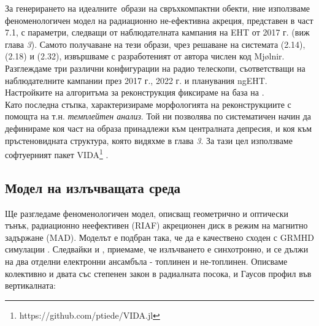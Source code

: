 За генерирането на идеалните$\,$ образи на свръхкомпактни обекти, ние използваме феноменологичен модел на радиационно не-ефективна акреция, представен в част 7.1, с параметри, следващи от наблюдателната кампания на EHT от 2017 г. (виж глава \emph{3}). Самото получаване на тези образи, чрез решаване на системата (2.14), (2.18) и (2.32), извършваме с разработеният от автора числен код Mjølnir. \\

Разглеждаме три различни конфигурации на радио телескопи, съответстващи на наблюдателните кампании през 2017 г., 2022 г. и планувания ngEHT.\\

Настройките на алгоритъма за реконструкция фиксираме на база на \cite{EHTIM}.\\

Като последна стъпка, характеризираме морфологията на реконструкциите с помощта на т.н. \emph{темплейтен анализ}. Той ни позволява по систематичен начин да дефинираме коя част на образа принадлежи към централната депресия, и коя към пръстеновидната структура, която видяхме в глава \emph{3}. За тази цел използваме софтуерният пакет VIDA\footnote{https://github.com/ptiede/VIDA.jl} \cite{VIDA}.

\subsection{Модел на излъчващата среда}

Ще разгледаме феноменологичен модел, описващ геометрично и оптически тънък, радиационно неефективен (RIAF) акреционен диск в режим на магнитно задържане (MAD). Моделът е подбран така, че да е качествено сходен с GRMHD симулации \cite{Yuan2003}. Следвайки \cite{Broderick2021} и \cite{Gold2020}, приемаме, че излъчването е синхотронно, и се дължи на два отделни електронни ансамбъла - топлинен и не-топлинен. Описваме колективно и двата със степенен закон в радиалната посока, и Гаусов профил във вертикалната:

